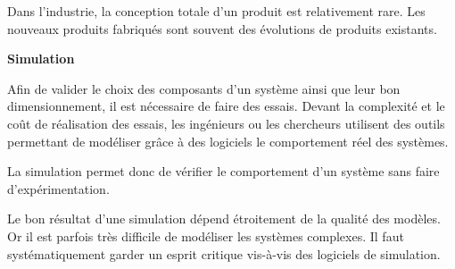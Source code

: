 \documentclass[11pt,oneside]{article}
\begin{document}
\begin{rem}
Dans l'industrie, la conception totale d'un produit est relativement rare. Les nouveaux produits fabriqués sont souvent des évolutions de produits existants. 
\end{rem}

\begin{defi}
\textbf{Simulation}

Afin de valider le choix des composants d'un système ainsi que leur bon dimensionnement, il est nécessaire de faire des essais. Devant la complexité et le coût de réalisation des essais, les ingénieurs ou les chercheurs utilisent des outils permettant de modéliser grâce à des logiciels le comportement réel des systèmes. 

La simulation permet donc de vérifier le comportement d'un système sans faire d'expérimentation.
\end{defi}

\begin{prob}
Le bon résultat d'une simulation dépend étroitement de la qualité des modèles. Or il est parfois très difficile de modéliser les systèmes complexes. Il faut systématiquement garder un esprit critique vis-à-vis des logiciels de simulation.
\end{prob}

\newpage
\end{document}
